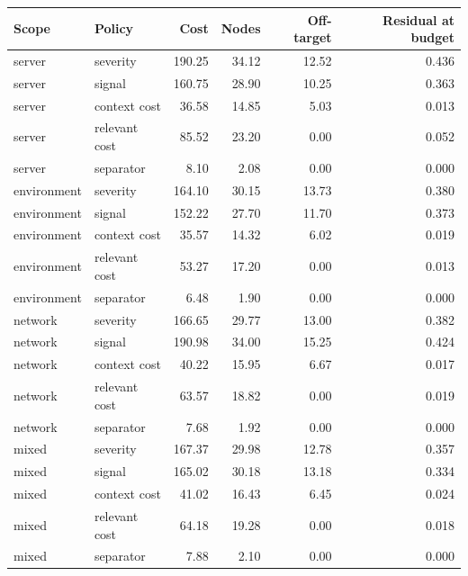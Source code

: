 \begin{tabular}{llrrrr}
\hline
Scope & Policy & Cost & Nodes & Off-target & Residual at budget \\
\hline
server & severity & 190.25 & 34.12 & 12.52 & 0.436 \\
server & signal & 160.75 & 28.90 & 10.25 & 0.363 \\
server & context cost & 36.58 & 14.85 & 5.03 & 0.013 \\
server & relevant cost & 85.52 & 23.20 & 0.00 & 0.052 \\
server & separator & 8.10 & 2.08 & 0.00 & 0.000 \\
environment & severity & 164.10 & 30.15 & 13.73 & 0.380 \\
environment & signal & 152.22 & 27.70 & 11.70 & 0.373 \\
environment & context cost & 35.57 & 14.32 & 6.02 & 0.019 \\
environment & relevant cost & 53.27 & 17.20 & 0.00 & 0.013 \\
environment & separator & 6.48 & 1.90 & 0.00 & 0.000 \\
network & severity & 166.65 & 29.77 & 13.00 & 0.382 \\
network & signal & 190.98 & 34.00 & 15.25 & 0.424 \\
network & context cost & 40.22 & 15.95 & 6.67 & 0.017 \\
network & relevant cost & 63.57 & 18.82 & 0.00 & 0.019 \\
network & separator & 7.68 & 1.92 & 0.00 & 0.000 \\
mixed & severity & 167.37 & 29.98 & 12.78 & 0.357 \\
mixed & signal & 165.02 & 30.18 & 13.18 & 0.334 \\
mixed & context cost & 41.02 & 16.43 & 6.45 & 0.024 \\
mixed & relevant cost & 64.18 & 19.28 & 0.00 & 0.018 \\
mixed & separator & 7.88 & 2.10 & 0.00 & 0.000 \\
\hline
\end{tabular}

